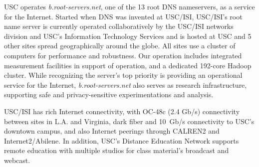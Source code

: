 \documentclass[11pt]{article}
\begin{document}
\iftrue
USC operates \emph{b.root-servers.net}, one of the 13 root DNS nameservers, as a service
  for the Internet.
Started when DNS was invented at USC/ISI,
  USC/ISI's root name server is currently operated collaboratively by the USC/ISI networks
  division and USC's Information Technology Services
and is hosted at USC and 5 other sites spread geographically around
  the globe.
All sites use a cluster of computers for performance and robustness.
Our operation includes integrated measurement facilities in support of operation,
  and a dedicated 192-core %
  Hadoop cluster.
While recognizing the server's top priority is providing an operational service for the Internet,
  \emph{b.root-servers.net} also serves as research infrastructure, supporting
  safe and privacy-sensitive experimentations and analysis.
\fi

\iffalse
For very large computations,
  we work closely with
  USC's \emph{High Performance Computing and Communications Facility} (HPCC), the 5th fastest academic
computer in the U.S. with more than 2500 2- or 4-core compute
  nodes and over 400TB of disk.
Inside HPCC we operate a small
  8-node Hadoop cluster dedicated for dataset processing.
\fi

USC/ISI has rich Internet connectivity,
  with OC-48c (2.4 Gb/s) connectivity between sites in L.A. and Virginia,
  dark fiber and 10~Gb/s connectivity to USC's downtown campus,
  and also Internet peerings
  through CALREN2 and Internet2/Abilene.
%
In addition,
USC's Distance Education Network supports
remote education  with multiple studios for class material's broadcast and
webcast.


\end{document}
